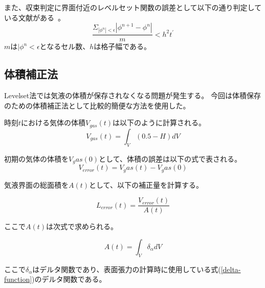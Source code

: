 また、収束判定に界面付近のレベルセット関数の誤差として以下の通り判定している文献がある~\cite{Shimizu2000}。
\begin{equation}
	\frac{\Sigma_{|\phi^{n}|<\epsilon} |\phi^{n+1}-\phi^{n}|}{m} < h^2 t^{\prime}
\end{equation}
$m$は$|\phi^{n}<\epsilon$となるセル数、$h$は格子幅である。


\subsection{体積補正法}

Levelset法では気液の体積が保存されなくなる問題が発生する。
今回は体積保存のための体積補正法として比較的簡便な方法を使用した。

時刻$t$における気体の体積$V_{gas}(t)$は以下のように計算される。
\begin{equation}
	V_{gas} (t) = \int_{V} (0.5 - H) dV
\end{equation}

初期の気体の体積を$V_gas(0)$として、体積の誤差は以下の式で表される。
\begin{equation}
	V_{error} (t) = V_gas(t) - V_gas(0)
\end{equation}

気液界面の総面積を$A(t)$として、以下の補正量を計算する。

\begin{equation}
	L_{error} (t) = \frac{V_{error}(t)}{A(t)}
\end{equation}

ここで$A(t)$は次式で求められる。

\begin{equation}
	A(t) = \int_{V} \delta_{\alpha} dV
\end{equation}

ここで$\delta_{\alpha}$はデルタ関数であり、表面張力の計算時に使用している式(\ref{delta-function})のデルタ関数である。


